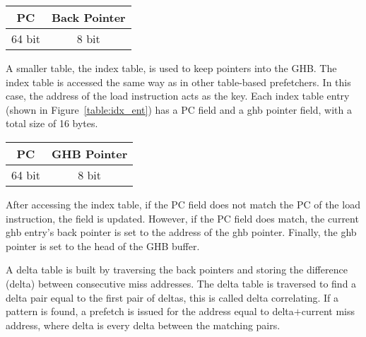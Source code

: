 \begin{center}
  \centering
  \begin{tabular}{| c | c |}
    \hline
    PC & Back Pointer \\ \hline
    64 bit & 8 bit \\ \hline
  \end{tabular}
  \label{table:ghb_ent}
\end{center}

A smaller table, the index table, is used to keep pointers into the
GHB. The index table is accessed the same way as in other table-based
prefetchers. In this case, the address of the load instruction acts as
the key. Each index table entry (shown in Figure~\ref{table:idx_ent})
has a PC field and a ghb pointer field, with a total size of 16 bytes.

\begin{center}
  \begin{tabular}{| c | c |}
    \hline
    PC & GHB Pointer \\ \hline
    64 bit & 8 bit \\ \hline
  \end{tabular}
  \label{table:idx_ent}
\end{center}

After accessing the index table, if the PC field does not match the PC
of the load instruction, the field is updated. However, if the PC
field does match, the current ghb entry's back pointer is set to the
address of the ghb pointer. Finally, the ghb pointer is set to the
head of the GHB buffer.

A delta table is built by traversing the back pointers and storing the
difference (delta) between consecutive miss addresses. The delta table
is traversed to find a delta pair equal to the first pair of deltas,
this is called delta correlating. If a pattern is found, a prefetch is
issued for the address equal to delta$+$current miss address, where
delta is every delta between the matching pairs.
